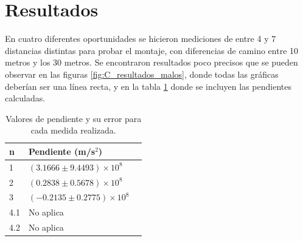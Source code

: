 \section{Resultados}

En cuatro diferentes oportunidades se hicieron mediciones de entre 4 y 7 distancias distintas para probar el montaje, con diferencias de camino entre 10 metros y los 30 metros. Se encontraron resultados poco precisos que se pueden observar en las figuras \ref{fig:C_resultados_malos}, donde todas las gráficas deberían ser una línea recta, y en la tabla \ref{tab:C_resultados_malos} donde se incluyen las pendientes calculadas.


\begin{table}[h]
\centering
\begin{tabular}{|l|l|l|}
\hline
n &  Pendiente (m/s$^2$) \\
\hline
1 & $(3.1666\pm 9.4493)\times 10^8$ \\

2 & $(0.2838\pm0.5678)\times10^8$  \\

3 & $(-0.2135\pm0.2775)\times10^8$\\
4.1 & No aplica \\
4.2 & No aplica \\
\hline
\end{tabular}
\caption{Valores de pendiente y su error para cada medida realizada.}
\label{tab:C_resultados_malos}
\end{table}





